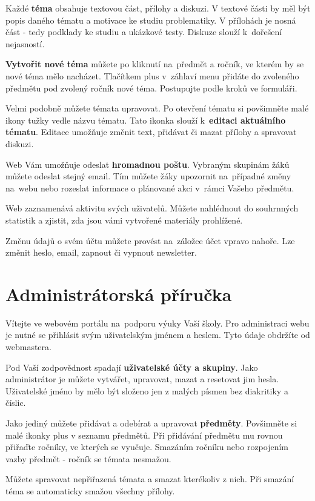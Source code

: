 \documentclass[thesis=B,czech]{FITthesis}[2012/06/26]
\begin{document}
Každé \textbf{téma} obsahuje textovou část, přílohy a diskuzi. V textové části by měl být popis daného tématu a motivace ke studiu problematiky. V přílohách je nosná část - tedy podklady ke studiu a ukázkové testy. Diskuze slouží k~dořešení nejasností.

\textbf{Vytvořit nové téma} můžete po kliknutí na~předmět a ročník, ve kterém by se nové téma mělo nacházet. Tlačítkem plus v~záhlaví menu přidáte do zvoleného předmětu pod zvolený ročník nové téma. Postupujte podle kroků ve formuláři.

Velmi podobně můžete témata upravovat. Po otevření tématu si povšimněte malé ikony tužky vedle názvu tématu. Tato ikonka slouží k~\textbf{editaci aktuálního tématu}. Editace umožňuje změnit text, přidávat či mazat přílohy a spravovat diskuzi.

Web Vám umožňuje odeslat \textbf{hromadnou poštu}. Vybraným skupinám žáků můžete odeslat stejný email. Tím můžete žáky upozornit na~případné změny na~webu nebo rozeslat informace o plánované akci v~rámci Vašeho předmětu.

Web zaznamenává aktivitu svých uživatelů. Můžete nahlédnout do souhrnných statistik a zjistit, zda jsou vámi vytvořené materiály prohlížené.

Změnu údajů o svém účtu můžete provést na~záložce účet vpravo nahoře. Lze změnit heslo, email, zapnout či vypnout newsletter.
\pagebreak

\section{Administrátorská příručka}

Vítejte ve webovém portálu na~podporu výuky Vaší školy. Pro administraci webu je nutné se přihlásit svým uživatelským jménem a heslem. Tyto údaje obdržíte od webmastera.

Pod Vaší zodpovědnost spadají \textbf{uživatelské účty a skupiny}. Jako administrátor je můžete vytvářet, upravovat, mazat a resetovat jim hesla. Uživatelské jméno by mělo být složeno jen z malých písmen bez diakritiky a číslic. 

Jako jediný můžete přidávat a odebírat a upravovat \textbf{předměty}. Povšimněte si malé ikonky plus v seznamu předmětů. Při přidávání předmětu mu rovnou přiřaďte ročníky, ve kterých se vyučuje. Smazáním ročníku nebo rozpojením vazby předmět - ročník se témata nesmažou.

Můžete spravovat nepřiřazená témata a smazat kterékoliv z nich. Při smazání téma se automaticky smažou všechny přílohy. 
\end{document}
